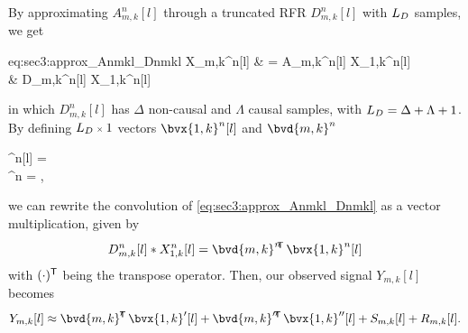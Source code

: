 By approximating $A_{m,k}^n[l]$ through a truncated RFR $D_{m,k}^n[l]$ with $\Ld$ samples, we get
\begin{equations}{eq:sec3:approx_Anmkl_Dnmkl}
	X_{m,k}^n[l]
	& = A_{m,k}^n[l] \ast X_{1,k}^n[l] \\
	& \approx D_{m,k}^n[l] \ast X_{1,k}^n[l]
\end{equations}
in which $D_{m,k}^n[l]$ has $\Delta$ non-causal and $\Lambda$ causal samples, with $\Ld = \Delta + \Lambda + 1$. By defining $\sz{\Ld}{1}$ vectors $\bvx{1,k}^n[l]$ and $\bvd{m,k}^n$
\begin{subgather}
	^n[l] =  \\
	^n =  , \label{eqs:vector-form_x1k_dmk:subeq2}
\end{subgather}
we can rewrite the convolution of \cref{eq:sec3:approx_Anmkl_Dnmkl} as a vector multiplication, given by
\begin{equation}
	D_{m,k}^n[l] \ast X_{1,k}^n[l] = \tr*{\bvd{m,k}^n} \bvx{1,k}^n[l]
\end{equation}
with $\tr{(\cdot)}$ being the transpose operator. Then, our observed signal $Y_{m,k}[l]$ becomes
\begin{equation}
	Y_{m,k}[l] \approx \tr*{\bvd{m,k}'} \bvx{1,k}'[l] + \tr*{\bvd{m,k}''} \bvx{1,k}''[l] + S_{m,k}[l] + R_{m,k}[l].
\end{equation}

